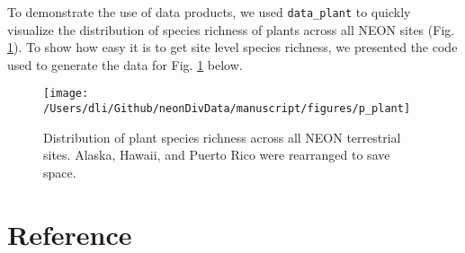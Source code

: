 \documentclass[
  12pt,
]{article}
\begin{document}
To demonstrate the use of data products, we used \texttt{data\_plant} to quickly visualize the distribution of species richness of plants across all NEON sites (Fig. \ref{fig:Fig2Map}). To show how easy it is to get site level species richness, we presented the code used to generate the data for Fig. \ref{fig:Fig2Map} below.



\begin{figure}

{\centering \texttt{[image: /Users/dli/Github/neonDivData/manuscript/figures/p\_plant]} 

}

\caption{Distribution of plant species richness across all NEON terrestrial sites. Alaska, Hawaii, and Puerto Rico were rearranged to save space.}\label{fig:Fig2Map}
\end{figure}

\hypertarget{reference}{%
\section*{Reference}\label{reference}}
\end{document}

